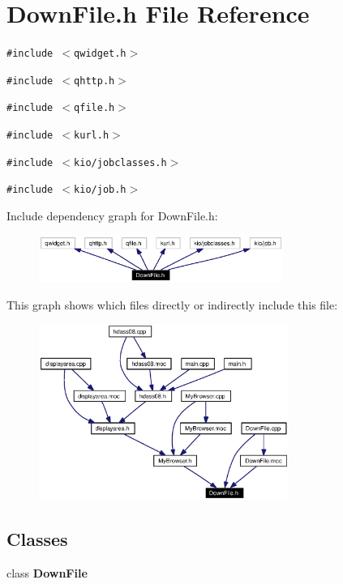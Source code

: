 \section{Down\-File.h File Reference}
\label{DownFile_8h}


{\tt \#include $<$qwidget.h$>$}\par
{\tt \#include $<$qhttp.h$>$}\par
{\tt \#include $<$qfile.h$>$}\par
{\tt \#include $<$kurl.h$>$}\par
{\tt \#include $<$kio/jobclasses.h$>$}\par
{\tt \#include $<$kio/job.h$>$}\par


Include dependency graph for Down\-File.h:\begin{figure}[H]
\begin{center}
\leavevmode
\includegraphics[width=226pt]{DownFile_8h__incl}
\end{center}
\end{figure}


This graph shows which files directly or indirectly include this file:\begin{figure}[H]
\begin{center}
\leavevmode
\includegraphics[width=231pt]{DownFile_8h__dep__incl}
\end{center}
\end{figure}
\subsection*{Classes}
\begin{CompactItemize}
\item 
class {\bf Down\-File}
\end{CompactItemize}
